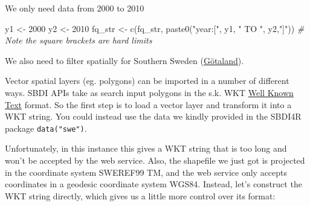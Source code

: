 \documentclass[
  10pt,
]{article}
\newenvironment{Shaded}{\begin{snugshade}}{\end{snugshade}}
\newcommand{\CommentTok}[1]{\textcolor[rgb]{0.56,0.35,0.01}{\textit{#1}}}
\newcommand{\DecValTok}[1]{\textcolor[rgb]{0.00,0.00,0.81}{#1}}
\newcommand{\FunctionTok}[1]{\textcolor[rgb]{0.00,0.00,0.00}{#1}}
\newcommand{\NormalTok}[1]{#1}
\newcommand{\OtherTok}[1]{\textcolor[rgb]{0.56,0.35,0.01}{#1}}
\newcommand{\SpecialCharTok}[1]{\textcolor[rgb]{0.00,0.00,0.00}{#1}}
\newcommand{\StringTok}[1]{\textcolor[rgb]{0.31,0.60,0.02}{#1}}
\begin{document}
We only need data from 2000 to 2010

\begin{Shaded}
\begin{Highlighting}[]
\NormalTok{y1 }\OtherTok{\textless{}{-}} \DecValTok{2000}
\NormalTok{y2 }\OtherTok{\textless{}{-}} \DecValTok{2010}
\NormalTok{fq\_str }\OtherTok{\textless{}{-}} \FunctionTok{c}\NormalTok{(fq\_str, }\FunctionTok{paste0}\NormalTok{(}\StringTok{"year:["}\NormalTok{, y1, }\StringTok{" TO "}\NormalTok{, y2,}\StringTok{"]"}\NormalTok{))}
\CommentTok{\# Note the square brackets are hard limits}
\end{Highlighting}
\end{Shaded}

We also need to filter spatially for Southern Sweden (\href{https://en.wikipedia.org/wiki/G\%C3\%B6taland}{Götaland}).

Vector spatial layers (eg. polygons) can be imported in a number of different ways.
SBDI APIs take as search input polygons in the s.k. WKT \href{https://www.geoapi.org/3.0/javadoc/org/opengis/referencing/doc-files/WKT.html}{Well Known Text}
format. So the first step is to load a vector layer and transform it into a WKT string.
You could instead use the data we kindly provided in the SBDI4R package \texttt{data("swe")}.

\begin{Shaded}
\end{Shaded}

Unfortunately, in this instance this gives a WKT string that is too long and won't
be accepted by the web service. Also, the shapefile we just got is projected in
the coordinate system SWEREF99 TM, and the web service only accepts coordinates in
a geodesic coordinate system WGS84. Instead, let's construct the WKT string directly,
which gives us a little more control over its format:
\end{document}

